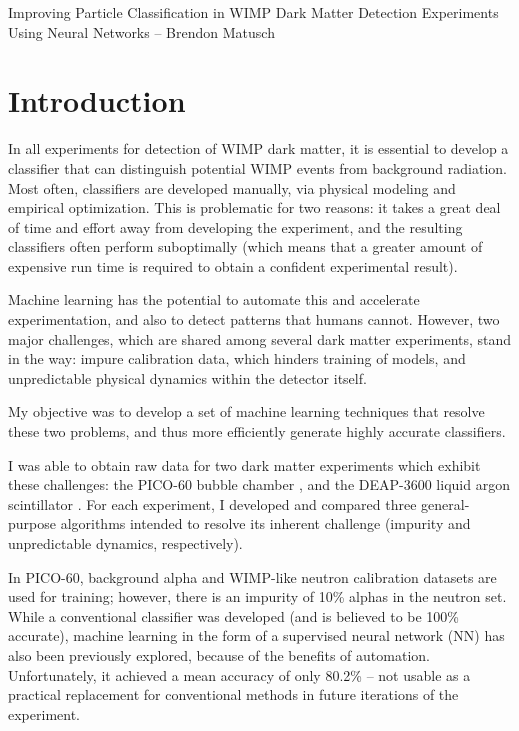 \documentclass[12pt]{article}
\begin{document}
\begin{center}
    \begin{large}
        Improving Particle Classification in WIMP Dark Matter Detection Experiments Using Neural Networks -- Brendon Matusch
    \end{large}
\end{center}

\section{Introduction}

In all experiments for detection of WIMP dark matter, it is essential to develop a classifier that can distinguish potential WIMP events from background radiation. Most often, classifiers are developed manually, via physical modeling and empirical optimization. This is problematic for two reasons: it takes a great deal of time and effort away from developing the experiment, and the resulting classifiers often perform suboptimally (which means that a greater amount of expensive run time is required to obtain a confident experimental result).

Machine learning has the potential to automate this and accelerate experimentation, and also to detect patterns that humans cannot. However, two major challenges, which are shared among several dark matter experiments, stand in the way: impure calibration data, which hinders training of models, and unpredictable physical dynamics within the detector itself.

My objective was to develop a set of machine learning techniques that resolve these two problems, and thus more efficiently generate highly accurate classifiers.

I was able to obtain raw data for two dark matter experiments which exhibit these challenges: the PICO-60 bubble chamber \cite{pico}, and the DEAP-3600 liquid argon scintillator \cite{deap}. For each experiment, I developed and compared three general-purpose algorithms intended to resolve its inherent challenge (impurity and unpredictable dynamics, respectively).

In PICO-60, background alpha and WIMP-like neutron calibration datasets are used for training; however, there is an impurity of 10\% alphas in the neutron set. While a conventional classifier was developed (and is believed to be 100\% accurate), machine learning in the form of a supervised neural network (NN) has also been previously explored, because of the benefits of automation. Unfortunately, it achieved a mean accuracy of only 80.2\% -- not usable as a practical replacement for conventional methods in future iterations of the experiment.
\end{document}
